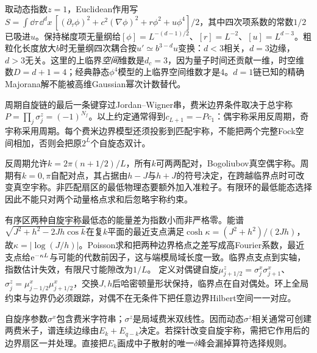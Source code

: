 取动态指数$z=1$，Euclidean作用写$S=\int\dd\tau\,\dd^dx\,[(\partial_\tau\phi)^2+c^2(\nabla\phi)^2+r\phi^2+u\phi^4]/2$，其中四次项系数的常数$1/2$已吸进$u$。保持梯度项无量纲给$[\phi]=L^{-(d-1)/2}$、$[r]=L^{-2}$、$[u]=L^{d-3}$。粗粒化长度放大$b$时无量纲四次耦合按$u'\simeq b^{3-d}u$变换：$d<3$相关，$d=3$边缘，$d>3$无关。这里的上临界\emph{空间}维数是$d_c=3$，因为量子时间还贡献一维，时空维数$D=d+1=4$；经典静态$\phi^4$模型的上临界空间维数才是4。$d=1$链已知的精确Majorana解不能被高维Gaussian幂次计数替代。

周期自旋链的最后一条键穿过Jordan--Wigner串，费米边界条件取决于总宇称$P=\prod_j\sigma_j^z=(-1)^{N_f}$。以上约定通常得到$c_{L+1}=-Pc_1$：偶宇称采用反周期，奇宇称采用周期。每个费米边界模型还须投影到匹配宇称，不能把两个完整Fock空间相加，否则会把原$2^L$个自旋态双计。

反周期允许$k=2\pi(n+1/2)/L$，所有$k$可两两配对，Bogoliubov真空偶宇称。周期有$k=0,\pi$自配对点，其占据由$h-J$与$h+J$的符号决定，在跨越临界点时可改变真空宇称。非匹配扇区的最低物理态要额外加入准粒子。有限环的最低能态选择因此不能只对两个动量格点求和后忽略宇称约束。

有序区两种自旋宇称最低态的能量差为指数小而非严格零。能谱$\sqrt{J^2+h^2-2Jh\cos k}$在复$k$平面的最近支点满足$\cosh\kappa=(J^2+h^2)/(2Jh)$，故$\kappa=|\log(J/h)|$。Poisson求和把两种边界格点之差写成高Fourier系数，最近支点给$\mathrm e^{-\kappa L}$与可能的代数前因子，这与端模局域长度一致。临界点支点到实轴，指数估计失效，有限尺寸能隙改为$1/L$。
定义对偶键自旋$\mu_{j+1/2}^z=\sigma_j^x\sigma_{j+1}^x$、$\sigma_j^z=\mu_{j-1/2}^x\mu_{j+1/2}^x$，交换$J,h$后哈密顿量形状保持，临界点在自对偶处。环上全局约束与边界仍必须跟踪，对偶不在无条件下把任意边界Hilbert空间一一对应。

自旋序参数$\sigma^x$包含费米字符串；$\sigma^z$是局域费米双线性。因而动态$\sigma^z$相关通常可创建两费米子，谱连续边缘由$E_k+E_{q-k}$决定。若探针改变自旋宇称，需把它作用后的边界扇区一并处理。直接把$E_k$画成中子散射的唯一$\delta$峰会漏掉算符选择规则。
